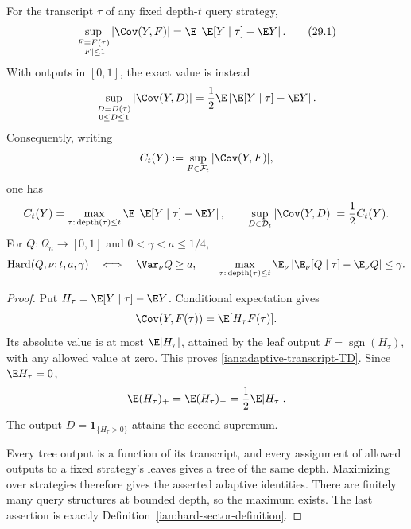 \begin{theorem}\label{ian:adaptive-transcript-duality}
For the transcript \(\tau\) of any fixed depth-\(t\) query strategy,
\[
 \sup_{\substack{F=F(\tau)\\ |F|\le1}}
 |\Cov(Y,F)|
 =
 \E\left|\E[Y\mid\tau]-\E Y\right|.
 \tag{29.1}\label{ian:adaptive-transcript-TD}
\]
With outputs in \([0,1]\), the exact value is instead
\[
 \sup_{\substack{D=D(\tau)\\0\le D\le1}}
 |\Cov(Y,D)|
 =
 \frac12\E\left|\E[Y\mid\tau]-\E Y\right|.
\]
Consequently, writing
\[
 C_t(Y):=\sup_{F\in\mathcal F_t}|\Cov(Y,F)|,
\]
one has
\[
 C_t(Y)
 =
 \max_{\tau:\,\mathrm{depth}(\tau)\le t}
 \E\left|\E[Y\mid\tau]-\E Y\right|,
 \qquad
 \sup_{D\in\mathcal D_t}|\Cov(Y,D)|=\frac12C_t(Y).
\]
For \(Q:\Omega_n\to[0,1]\) and \(0<\gamma<a\le1/4\),
\[
 \operatorname{Hard}(Q,\nu;t,a,\gamma)
 \quad\Longleftrightarrow\quad
 \Var_\nu Q\ge a,\qquad
 \max_{\tau:\,\mathrm{depth}(\tau)\le t}
 \E_\nu\left|\E_\nu[Q\mid\tau]-\E_\nu Q\right|\le\gamma.
\]
\end{theorem}
\begin{proof}
Put \(H_\tau=\E[Y\mid\tau]-\E Y\). Conditional expectation gives
\[
 \Cov(Y,F(\tau))=\E[H_\tau F(\tau)].
\]
Its absolute value is at most \(\E|H_\tau|\), attained by the leaf output
\(F=\operatorname{sgn}(H_\tau)\), with any allowed value at zero. This proves
\eqref{ian:adaptive-transcript-TD}. Since \(\E H_\tau=0\),
\[
 \E(H_\tau)_+=\E(H_\tau)_-=\frac12\E|H_\tau|.
\]
The output \(D=\mathbf1_{\{H_\tau>0\}}\) attains the second supremum.

Every tree output is a function of its transcript, and every assignment of allowed outputs to a fixed strategy's leaves gives a tree of the same depth. Maximizing over strategies therefore gives the asserted adaptive identities. There are finitely many query structures at bounded depth, so the maximum exists. The last assertion is exactly Definition~\ref{ian:hard-sector-definition}.
\end{proof}


